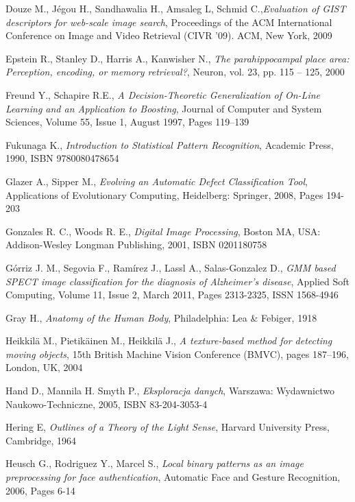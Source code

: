 \begin{thebibliography}{100}
 Douze M., Jégou H., Sandhawalia H., Amsaleg L, Schmid C.,\emph{Evaluation of GIST descriptors for web-scale image search}, Proceedings of the ACM International Conference on Image and Video Retrieval (CIVR '09). ACM, New York, 2009

 Epstein R., Stanley D., Harris A., Kanwisher N., \emph{The parahippocampal place area: Perception, encoding, or memory retrieval?}, Neuron, vol. 23, pp. 115 – 125, 2000

 Freund Y., Schapire R.E., \emph{A Decision-Theoretic Generalization of On-Line Learning and an Application to Boosting}, Journal of Computer and System Sciences, Volume 55, Issue 1, August 1997, Pages 119–139

 Fukunaga K., \emph{Introduction to Statistical Pattern Recognition}, Academic Press, 1990, ISBN 9780080478654

 Glazer A., Sipper M., \emph{Evolving an Automatic Defect Classification Tool}, Applications of Evolutionary Computing, Heidelberg: Springer, 2008, Pages 194-203

 Gonzales R. C., Woods R. E., \emph{Digital Image Processing}, Boston MA, USA: Addison-Wesley Longman Publishing, 2001, ISBN 0201180758

 Górriz J. M., Segovia F., Ramírez J., Lassl A., Salas-Gonzalez D., \emph{GMM based SPECT image classification for the diagnosis of Alzheimer’s disease}, Applied Soft Computing, Volume 11, Issue 2, March 2011, Pages 2313-2325, ISSN 1568-4946

 Gray H., \emph{Anatomy of the Human Body}, Philadelphia: Lea \& Febiger, 1918 

 Heikkilä M., Pietikäinen M., Heikkilä J., \emph{A texture-based method for detecting moving objects}, 15th British Machine Vision Conference (BMVC), pages 187–196, London, UK, 2004

 Hand D., Mannila H. Smyth P., \emph{Eksploracja danych}, Warszawa: Wydawnictwo Naukowo-Techniczne, 2005, ISBN 83-204-3053-4

 Hering E, \emph{Outlines of a Theory of the Light Sense}, Harvard University Press, Cambridge, 1964

 Heusch G., Rodriguez Y., Marcel S., \emph{Local binary patterns as an image preprocessing for face authentication}, Automatic Face and Gesture Recognition, 2006, Pages 6-14


\end{thebibliography}
